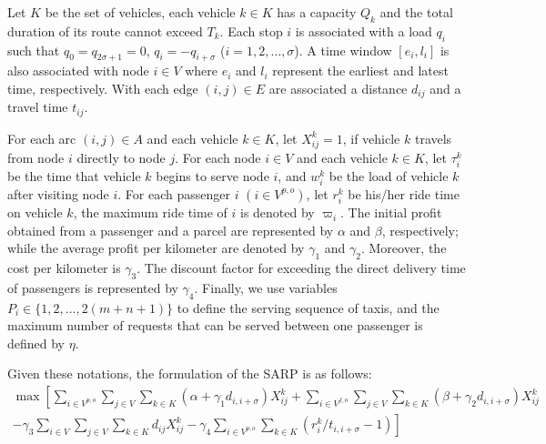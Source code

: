 \documentclass[preprint,authoryear,12pt]{elsarticle}
\begin{document}
Let $K$ be the set of vehicles, each vehicle $k \in K$ has a capacity $Q_k$ and the total duration of its route cannot exceed $T_k$. Each stop $i$ is associated with a load $q_i$ such that $q_0 = q_{2\sigma+1} = 0$, $q_i = -q_{i+\sigma}$ ($i = 1,2,\ldots,\sigma$). A time window $[e_i,l_i]$ is also associated with node $i \in V$ where $e_i$ and $l_i$ represent the earliest and latest time, respectively. With each edge $(i,j) \in E$ are associated a distance $d_{ij}$ and a travel time $t_{ij}$.

For each arc $(i,j) \in A$ and each vehicle $k \in K$, let $X_{ij}^{k} = 1$, if vehicle $k$ travels from node $i$ directly to node $j$. For each node $i \in V$ and each vehicle $k \in K$, let $\tau_i^k$ be the time that vehicle $k$ begins to serve node $i$, and $w_i^k$ be the load of vehicle $k$ after visiting node $i$. For each passenger $i$ $(i\in V^{p,o})$, let $r_i^k$ be his/her ride time on vehicle $k$, the maximum ride time of $i$ is denoted by $\varpi_i$. The initial profit obtained from a passenger and a parcel are represented by $\alpha$ and $\beta$, respectively; while the average profit per kilometer are denoted by $\gamma_1$ and $\gamma_2$.
Moreover, the cost per kilometer is $\gamma_3$. The discount factor for exceeding the direct delivery time of passengers is represented by $\gamma_4$. Finally, we use variables $P_i\in \{1,2,\dots,2(m+n+1)\}$ to define the serving sequence of taxis, and the maximum number of requests that can be served between one passenger is defined by $\eta$.

Given these notations, the formulation of the SARP is as follows:
\vspace{-1em}
\begin{eqnarray}
\max\left[ \sum\limits_{i\in V^{p,o}}\sum\limits_{j\in V}\sum\limits_{k\in K}(\alpha+\gamma_1 d_{i,i+\sigma})X_{ij}^{k}
+\sum\limits_{i\in V^{f,o}}\sum\limits_{j\in V}\sum\limits_{k\in K}(\beta+\gamma_2 d_{i,i+\sigma})X_{ij}^{k}\right.\nonumber\\
\left.-\gamma_3 \sum\limits_{i\in V}\sum\limits_{j\in V}\sum\limits_{k\in K} d_{ij}X_{ij}^{k}
-\gamma_4 \sum\limits_{i\in V^{p,o}}\sum\limits_{k\in K} (r_i^k /t_{i,i+\sigma}-1)\right]
\label{sarp:0}
\end{eqnarray}
\end{document}
